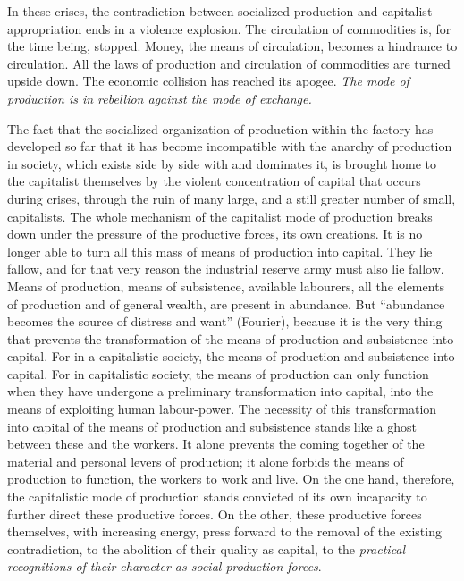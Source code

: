 In these crises, the contradiction between socialized production and capitalist
appropriation ends in a violence explosion. The circulation of commodities is,
for the time being, stopped. Money, the means of circulation, becomes a
hindrance to circulation. All the laws of production and circulation of
commodities are turned upside down. The economic collision has reached its
apogee. \emph{The mode of production is in rebellion against the mode of
exchange.}

The fact that the socialized organization of production within the factory has
developed so far that it has become incompatible with the anarchy of production
in society, which exists side by side with and dominates it, is brought home to
the capitalist themselves by the violent concentration of capital that occurs
during crises, through the ruin of many large, and a still greater number of
small, capitalists. The whole mechanism of the capitalist mode of production
breaks down under the pressure of the productive forces, its own creations. It
is no longer able to turn all this mass of means of production into capital.
They lie fallow, and for that very reason the industrial reserve army must also
lie fallow. Means of production, means of subsistence, available labourers, all
the elements of production and of general wealth, are present in abundance. But
``abundance becomes the source of distress and want'' (Fourier), because it is
the very thing that prevents the transformation of the means of production and
subsistence into capital. For in a capitalistic society, the means of production
and subsistence into capital. For in capitalistic society, the means of
production can only function when they have undergone a preliminary
transformation into capital, into the means of exploiting human labour-power.
The necessity of this transformation into capital of the means of production and
subsistence stands like a ghost between these and the workers. It alone prevents
the coming together of the material and personal levers of production; it alone
forbids the means of production to function, the workers to work and live. On
the one hand, therefore, the capitalistic mode of production stands convicted of
its own incapacity to further direct these productive forces. On the other,
these productive forces themselves, with increasing energy, press forward to the
removal of the existing contradiction, to the abolition of their quality as
capital, to the \emph{practical recognitions of their character as social
production forces}.

